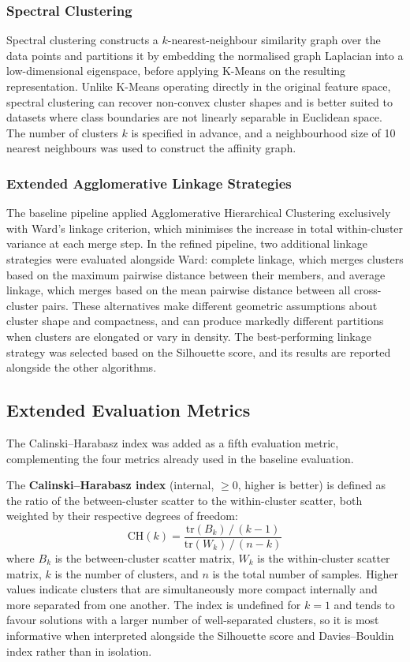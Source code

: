\documentclass[runningheads,a4paper,11pt]{report}
\begin{document}
\subsubsection{Spectral Clustering}

Spectral clustering constructs a $k$-nearest-neighbour similarity graph over the data points and partitions it by embedding the normalised graph Laplacian into a low-dimensional eigenspace, before applying K-Means on the resulting representation. Unlike K-Means operating directly in the original feature space, spectral clustering can recover non-convex cluster shapes and is better suited to datasets where class boundaries are not linearly separable in Euclidean space. The number of clusters $k$ is specified in advance, and a neighbourhood size of 10 nearest neighbours was used to construct the affinity graph.

\subsubsection{Extended Agglomerative Linkage Strategies}

The baseline pipeline applied Agglomerative Hierarchical Clustering exclusively with Ward's linkage criterion, which minimises the increase in total within-cluster variance at each merge step. In the refined pipeline, two additional linkage strategies were evaluated alongside Ward: complete linkage, which merges clusters based on the maximum pairwise distance between their members, and average linkage, which merges based on the mean pairwise distance between all cross-cluster pairs. These alternatives make different geometric assumptions about cluster shape and compactness, and can produce markedly different partitions when clusters are elongated or vary in density. The best-performing linkage strategy was selected based on the Silhouette score, and its results are reported alongside the other algorithms.

\subsection{Extended Evaluation Metrics}
\label{section:extendedMetrics}

The Calinski--Harabasz index was added as a fifth evaluation metric, complementing the four metrics already used in the baseline evaluation.

The \textbf{Calinski--Harabasz index} (internal, $\geq 0$, higher is better) is defined as the ratio of the between-cluster scatter to the within-cluster scatter, both weighted by their respective degrees of freedom:
\[
    \text{CH}(k) = \frac{\mathrm{tr}(B_k)\,/\,(k-1)}{\mathrm{tr}(W_k)\,/\,(n-k)}
\]
where $B_k$ is the between-cluster scatter matrix, $W_k$ is the within-cluster scatter matrix, $k$ is the number of clusters, and $n$ is the total number of samples. Higher values indicate clusters that are simultaneously more compact internally and more separated from one another. The index is undefined for $k = 1$ and tends to favour solutions with a larger number of well-separated clusters, so it is most informative when interpreted alongside the Silhouette score and Davies--Bouldin index rather than in isolation.
\end{document}
